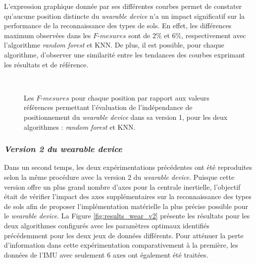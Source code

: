 L'expression graphique donnée par ses différentes courbes permet de constater qu'aucune position distincte du \textit{wearable device} n'a un impact significatif sur la performance de la reconnaissance des types de sols. En effet, les différences maximum observées dans les $F\mbox{-}mesures$ sont de $2\%$ et $6\%$, respectivement avec l'algorithme \textit{random forest} et \acs{KNN}. De plus, il est possible, pour chaque algorithme, d'observer une similarité entre les tendances des courbes exprimant les résultats et de référence.

\begin{figure}[H]
  \centering
{}
  \\[20pt]
  \caption{Les $F\mbox{-} mesures$ pour chaque position par rapport aux valeurs références permettant l'évaluation de l'indépendance de positionnement du \textit{wearable device} dans sa version 1, pour les deux algorithmes : \textit{random forest} et \acs{KNN}.}
  \label{fig:pos_ind_wear_v1}
\end{figure}


\subsubsection{\textit{Version 2 du wearable device}}

Dans un second temps, les deux expérimentations précédentes ont été reproduites selon la même procédure avec la version 2 du \textit{wearable device}. Puisque cette version offre un plus grand nombre d'axes pour la centrale inertielle, l'objectif était de vérifier l'impact des axes supplémentaires sur la reconnaissance des types de sols afin de proposer l'implémentation matérielle la plus précise possible pour le \textit{wearable device}. La Figure \ref{fig:results_wear_v2} présente les résultats pour les deux algorithmes configurés avec les paramètres optimaux identifiés précédemment pour les deux jeux de données différents. Pour atténuer la perte d'information dans cette expérimentation comparativement à la première, les données de l'\acs{IMU} avec seulement 6 axes ont également été traitées.

